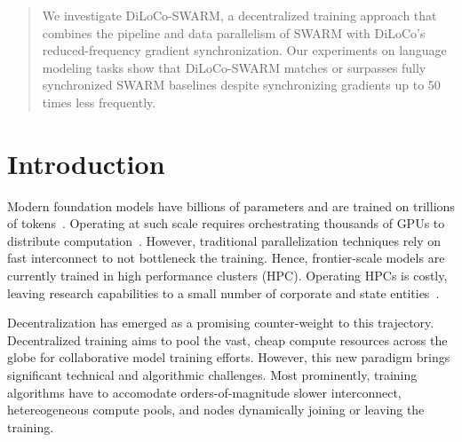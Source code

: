 \documentclass{article}
\begin{document}
\begin{abstract}
  We investigate DiLoCo-SWARM, a decentralized training approach that combines
  the pipeline and data parallelism of SWARM with DiLoCo's reduced-frequency
  gradient synchronization. Our experiments on language modeling tasks show that
  DiLoCo-SWARM matches or surpasses fully synchronized SWARM baselines despite
  synchronizing gradients up to 50 times less frequently.
\end{abstract}

\section{Introduction}

Modern foundation models have billions of parameters and are trained on
trillions of
tokens~\cite{chowdhery2022palm,brown2023gpt3,dubey2024llama3,google2024gemini}.
Operating at such scale requires orchestrating thousands of GPUs to distribute
computation~\cite{dubey2024llama3,deepseekai2024}. However, traditional
parallelization techniques rely on fast interconnect to not bottleneck the
training. Hence, frontier-scale models are currently trained in high performance
clusters (HPC). Operating HPCs is costly, leaving research capabilities to a
small number of corporate and state entities~\cite{jaghouar2024intellect1}. 


Decentralization has emerged as a promising counter-weight to this
trajectory. Decentralized training aims to pool the vast, cheap compute
resources across the globe for collaborative model training efforts. However,
this new paradigm brings significant technical and algorithmic challenges. Most
prominently, training algorithms have to accomodate orders-of-magnitude slower
interconnect, hetereogeneous compute pools, and nodes dynamically joining or
leaving the training. 
\end{document}
